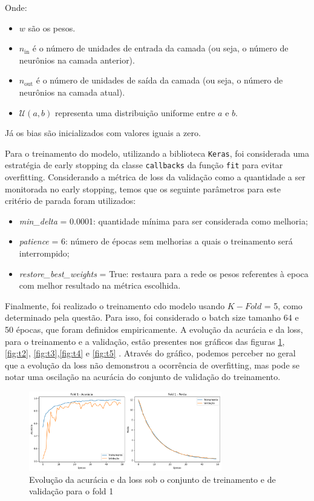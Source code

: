 \documentclass[]{abntex2}
\begin{document}
Onde:
\begin{itemize}
    \item \( w \) são os pesos.
    \item \( n_{\text{in}} \) é o número de unidades de entrada da camada (ou seja, o número de neurônios na camada anterior).
    \item \( n_{\text{out}} \) é o número de unidades de saída da camada (ou seja, o número de neurônios na camada atual).
    \item \( \mathcal{U}(a, b) \) representa uma distribuição uniforme entre \( a \) e \( b \).
\end{itemize}

Já os bias são inicializados com valores iguais a zero.

Para o treinamento do modelo, utilizando a biblioteca \texttt{Keras}, foi considerada uma estratégia de early stopping da classe \texttt{callbacks} da função \texttt{fit} para evitar overfitting. Considerando a métrica de loss da validação como a quantidade a ser monitorada no early stopping, temos que os seguinte parâmetros para este critério de parada foram utilizados:

\begin{itemize}
    \item \textit{min\_delta} = 0.0001:  quantidade mínima para ser considerada como melhoria;
    \item \textit{patience} = 6: número de épocas sem melhorias a quais o treinamento será interrompido;
    \item \textit{restore\_best\_weights} = True: restaura para a rede os pesos referentes à epoca com melhor resultado na métrica escolhida.
\end{itemize}

Finalmente, foi realizado o treinamento cdo modelo usando $K-Fold$ = 5, como determinado pela questão. Para isso, foi considerado o batch size tamanho 64 e 50 épocas, que foram definidos empiricamente. A evolução da acurácia e da loss, para o treinamento e a validação, estão presentes nos gráficos das figuras \ref{fig:t1}, \ref{fig:t2}, \ref{fig:t3},\ref{fig:t4} e \ref{fig:t5} . Através do gráfico, podemos perceber no geral que a evolução da loss não demonstrou a ocorrência de overfitting, mas pode se notar uma oscilação na acurácia do conjunto de validação do treinamento.

\begin{figure}[H]
    \centering 
    \includegraphics[width=0.75\textwidth]{imgs/ex2/train_f1.png}
    \caption{Evolução da acurácia e da loss sob o conjunto de treinamento e de validação para o fold 1}
    \label{fig:t1} %
\end{figure}
\end{document}
